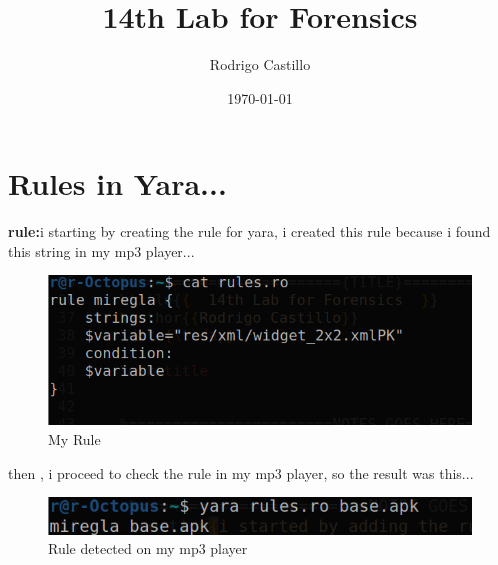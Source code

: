 \documentclass[10pt,a4paper]{article} %
\begin{document}
    \title{{  14th Lab for Forensics  }}
    \author{{Rodrigo Castillo}}
    \date{\today}

    \maketitle


    \section{Rules in Yara...}
    \textbf{rule:}i starting by creating the rule for yara, i created this rule
    because i found this string in my mp3 player...
    \begin{figure}[h!]
        \centering
        \includegraphics[width=0.8\linewidth]{rule.png}
        \caption{My Rule}
        \label{r}
    \end{figure}
    then , i proceed to check the rule in my mp3 player, so the result was
    this...
    \begin{figure}[h!]
        \centering
        \includegraphics[width=0.8\linewidth]{detected.png}
        \caption{Rule detected on my mp3 player}
        \label{rule}
    \end{figure}
    \newpage
\end{document}
